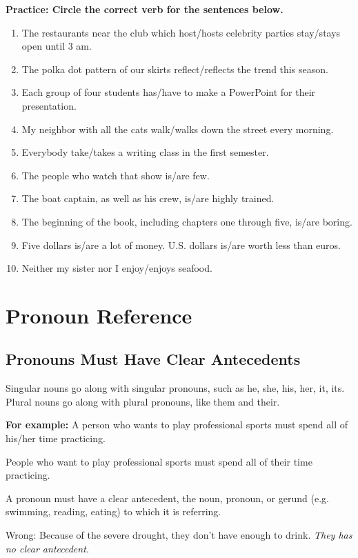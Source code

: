 \bigskip
\textbf{Practice: Circle the correct verb for the sentences below.}
\begin{enumerate} 
\item{The restaurants near the club which host/hosts celebrity parties stay/stays open until 3 am.}
\item{The polka dot pattern of our skirts reflect/reflects the trend this season.}
\item{Each group of four students has/have to make a PowerPoint for their presentation.}
\item{My neighbor with all the cats walk/walks down the street every morning.}
\item{Everybody take/takes a writing class in the first semester.}
\item{The people who watch that show is/are few.}
\item{The boat captain, as well as his crew, is/are highly trained.}
\item{The beginning of the book, including chapters one through five, is/are boring.}
\item{Five dollars is/are a lot of money.  U.S. dollars is/are worth less than euros.}
\item{Neither my sister nor I enjoy/enjoys seafood.}
\end{enumerate}

\bigskip

\bigskip
\section{Pronoun Reference}
\subsection{Pronouns Must Have Clear Antecedents}
Singular nouns go along with singular pronouns, such as he, she, his, her, it, its.
Plural nouns go along with plural pronouns, like them and their.

\bigskip
\textbf{For example:}
A person who wants to play professional sports must spend all of his/her time practicing.

\bigskip
People who want to play professional sports must spend all of their time practicing.

\bigskip
A pronoun must have a clear antecedent, the noun, pronoun, or gerund (e.g. swimming, reading, eating) to which it is referring.

\bigskip
Wrong: Because of the severe drought, they don't have enough to drink.
\textit{They has no clear antecedent.}

